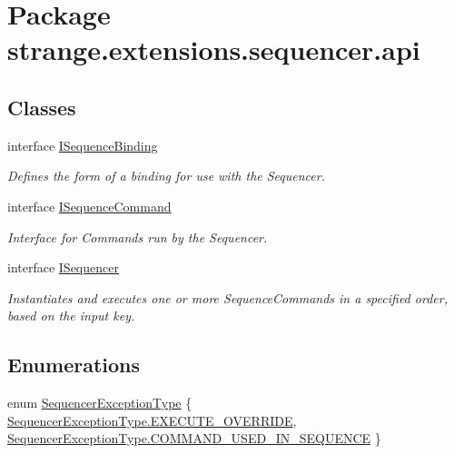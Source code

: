 \hypertarget{namespacestrange_1_1extensions_1_1sequencer_1_1api}{\section{Package strange.\-extensions.\-sequencer.\-api}
\label{namespacestrange_1_1extensions_1_1sequencer_1_1api}
}
\subsection*{Classes}
\begin{DoxyCompactItemize}
\item 
interface \hyperlink{interfacestrange_1_1extensions_1_1sequencer_1_1api_1_1_i_sequence_binding}{I\-Sequence\-Binding}
\begin{DoxyCompactList}\small\item\em Defines the form of a binding for use with the Sequencer. \end{DoxyCompactList}\item 
interface \hyperlink{interfacestrange_1_1extensions_1_1sequencer_1_1api_1_1_i_sequence_command}{I\-Sequence\-Command}
\begin{DoxyCompactList}\small\item\em Interface for Commands run by the Sequencer. \end{DoxyCompactList}\item 
interface \hyperlink{interfacestrange_1_1extensions_1_1sequencer_1_1api_1_1_i_sequencer}{I\-Sequencer}
\begin{DoxyCompactList}\small\item\em Instantiates and executes one or more Sequence\-Commands in a specified order, based on the input key. \end{DoxyCompactList}\end{DoxyCompactItemize}
\subsection*{Enumerations}
\begin{DoxyCompactItemize}
\item 
enum \hyperlink{namespacestrange_1_1extensions_1_1sequencer_1_1api_aeddaacdea22f90d94ab298d24cbce41b}{Sequencer\-Exception\-Type} \{ \hyperlink{namespacestrange_1_1extensions_1_1sequencer_1_1api_aeddaacdea22f90d94ab298d24cbce41ba649c27d7db043238f4e8ee0d1c8c52fc}{Sequencer\-Exception\-Type.\-E\-X\-E\-C\-U\-T\-E\-\_\-\-O\-V\-E\-R\-R\-I\-D\-E}, 
\hyperlink{namespacestrange_1_1extensions_1_1sequencer_1_1api_aeddaacdea22f90d94ab298d24cbce41ba80650e930022474abe93d5663d7e6744}{Sequencer\-Exception\-Type.\-C\-O\-M\-M\-A\-N\-D\-\_\-\-U\-S\-E\-D\-\_\-\-I\-N\-\_\-\-S\-E\-Q\-U\-E\-N\-C\-E}
 \}
\end{DoxyCompactItemize}


